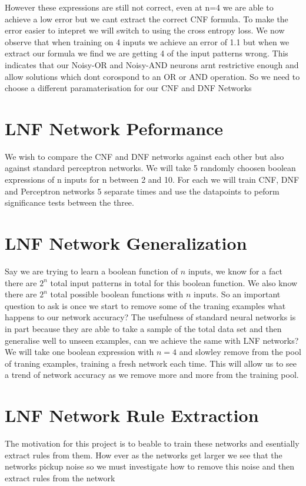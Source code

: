 \documentclass{article}
\theoremstyle{definition}
\begin{document}
However these expressions are still not correct, even at n=4 we are able to achieve a low error but we cant extract the correct CNF formula. To make the error easier to intepret we will switch to using the cross entropy loss. We now observe that when training on 4 inputs we achieve an error of 1.1 but when we extract our formula we find we are getting 4 of the input patterns wrong. This indicates that our Noisy-OR and Noisy-AND neurons arnt restrictive enough and allow solutions which dont corospond to an OR or AND operation. So we need to choose a different paramaterisation for our CNF and DNF Networks

\section{LNF Network Peformance}
We wish to compare the CNF and DNF networks against each other but also against standard perceptron networks. We will take 5 randomly choosen boolean expressions of n inputs for n between 2 and 10. For each we will train CNF, DNF and Perceptron networks 5 separate times and use the datapoints to peform significance tests between the three.

\section{LNF Network Generalization}
Say we are trying to learn a boolean function of $n$ inputs, we know for a fact there are $2^n$ total input patterns in total for this boolean function. We also know there are $2^n$ total possible boolean functions with $n$ inputs. So an important question to ask is once we start to remove some of the traning examples what happens to our network accuracy? The usefulness of standard neural networks is in part because they are able to take a sample of the total data set and then generalise well to unseen examples, can we achieve the same with LNF networks?\\

We will take one boolean expression with $n = 4$ and slowley remove from the pool of traning examples, training a fresh network each time. This will allow us to see a trend of network accuracy as we remove more and more from the training pool.

\section{LNF Network Rule Extraction}
The motivation for this project is to beable to train these networks and esentially extract rules from them. How ever as the networks get larger we see that the networks pickup noise so we must investigate how to remove this noise and then extract rules from the network
\end{document}
